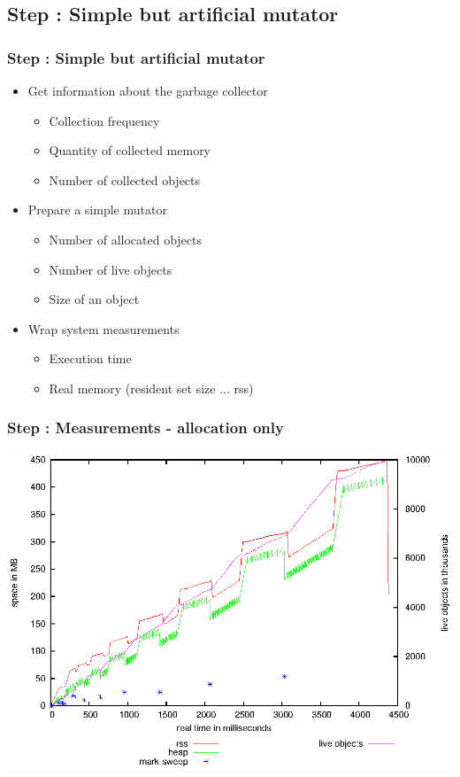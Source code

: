 \subsection{Step \theStepCounter: Simple but artificial mutator}
\begin{frame}
	\frametitle{Step \theStepCounter: Simple but artificial mutator}
	\begin{itemize}
		\item Get information about the garbage collector
		\begin{itemize}
			\item Collection frequency %
			\item Quantity of collected memory
			\item Number of collected objects
		\end{itemize}
		
		\smallskip
		\pause
			
		\item Prepare a simple mutator
		\begin{itemize}
			\item Number of allocated objects
			\item Number of live objects
			\item Size of an object
		\end{itemize}
			
		\smallskip
		\pause
			
		\item Wrap system measurements
		\begin{itemize}
			\item Execution time
			\item Real memory (resident set size ... rss) 
		\end{itemize}
	\end{itemize}
\end{frame}
\begin{frame} 
	\frametitle{Step \theStepCounter: Measurements - allocation only}
	\begin{center}
		\includegraphics[width=.9\textwidth]{../plots/keep_all_obj_rss_heap_mas_obj_time.eps}
	\end{center}
\end{frame}
